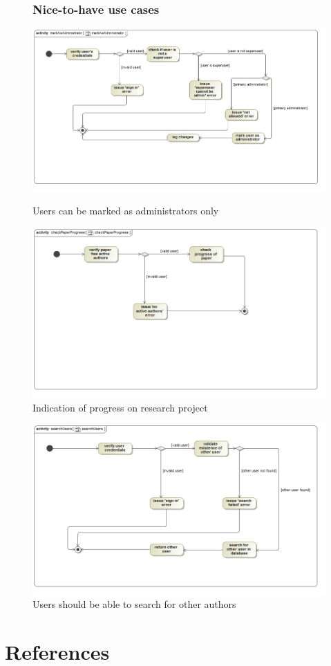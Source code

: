 \documentclass[a4paper,12pt]{report}
\begin{document}
\begin{figure}[ht]
\subsubsection{Nice-to-have use cases}
\includegraphics[scale=0.5]{act__markAsAdministrator__markAsAdministrator.jpg} 
\caption{Users can be marked as administrators only}


\includegraphics[scale=0.5]{act__checkPaperProgress__checkPaperProgress.jpg} 
\caption{Indication of progress on research project}

\end{figure}
\newpage
\begin{figure}[ht]

\includegraphics[scale=0.5]{act__searchUsers__searchUsers.jpg} 
\caption{Users should be able to search for other authors}


\end{figure}

\newpage
\section{References} 
\end{document}
